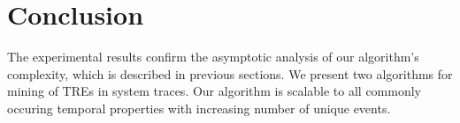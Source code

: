 \documentclass[]{sigplanconf}
\begin{document}
\section{Conclusion}

The experimental results confirm the asymptotic analysis of our algorithm's complexity, which is described in previous sections. We present two algorithms for mining of TREs in system traces. Our algorithm is scalable to all commonly occuring temporal properties with increasing number of unique events.


%


\end{document}
